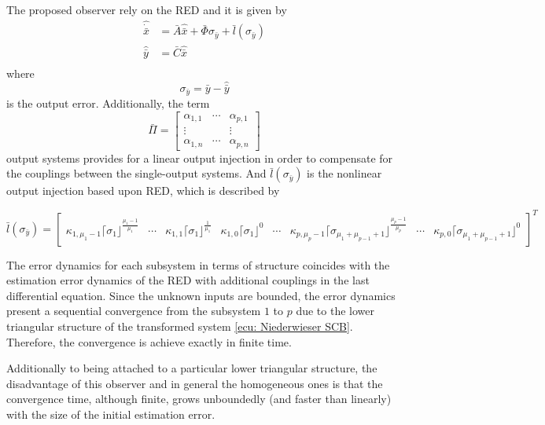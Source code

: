 \documentclass[11pt,letterpaper,twoside,openright]{report}
\newcommand{\sig}[2]{\lceil#1\rfloor^{#2}}
\begin{document}
The proposed observer rely on the RED \cite{Levant1998} and it is given by
\begin{equation}
\begin{split}
\hat{\dot{\bar{x}}} &= \bar{A}\hat{\bar{x}} + \bar{\Phi}\sigma_{\bar{y}} + \bar{l}(\sigma_{\bar{y}}) \\
\hat{\bar{y}} &= \bar{C}\hat{\bar{x}} \\
\end{split}
\end{equation}
where
\begin{equation}
\sigma_{\bar{y}} = \bar{y}-\hat{\bar{y}}
\end{equation}
is the output error. Additionally, the term
\begin{equation}
\bar{\Pi} = \left[
\begin{array}{ccc}
\alpha_{1,1} & \cdots & \alpha_{p,1} \\
\vdots &  & \vdots \\
\alpha_{1,n} & \cdots & \alpha_{p,n}
\end{array}
\right]
\end{equation}
output systems provides for a linear output injection in order to compensate for the couplings between the single-output systems. And $\bar{l}(\sigma_{\bar{y}})$ is the nonlinear output injection based upon RED, which is described by
\begin{small}
\begin{equation}
\bar{l}(\sigma_{\bar{y}}) = \left[
\begin{array}{cccc|c|ccc}
\kappa_{1,\mu_1-1}\sig{\sigma_1}{\frac{\mu_1-1}{\mu_1}} & \cdots & \kappa_{1,1}\sig{\sigma_1}{\frac{1}{\mu_1}} & \kappa_{1,0}\sig{\sigma_1}{0} & \cdots & \kappa_{p,\mu_p-1}\sig{\sigma_{\mu_1+\mu_{p-1}+1}}{\frac{\mu_p-1}{\mu_p}} & \cdots & \kappa_{p,0}\sig{\sigma_{\mu_1+\mu_{p-1}+1}}{0}
\end{array}
\right]^T
\end{equation}
\end{small}

The error dynamics for each subsystem in terms of structure coincides with the estimation error dynamics of the RED with additional couplings in the last differential equation. Since the unknown inputs are bounded, the error dynamics present a sequential convergence from the subsystem $1$ to $p$ due to the lower triangular structure of the transformed system \eqref{ecu: Niederwieser SCB}. Therefore, the convergence is achieve exactly in finite time.

Additionally to being attached to a particular lower triangular structure, the disadvantage of this observer and in general the homogeneous ones is that the convergence time, although finite, grows unboundedly (and faster than linearly) with the size of the initial estimation error.
\end{document}
